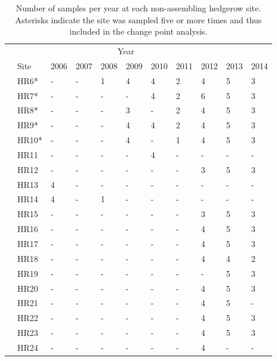 \documentclass[12pt]{article}
\begin{document}
\begin{table}
  \renewcommand*\arraystretch{1.25}
  \centering
  \caption{Number of samples per year at each non-assembling hedgerow
    site. Asterisks indicate the site was sampled five or more times
    and thus included in the change point analysis.} 
  \begin{tabular}{lllllllllll}
    \hline
    \multicolumn{10}{c}{\hspace{10em}Year}\\
    & Site & 2006 & 2007 & 2008 & 2009 & 2010 & 2011 & 2012 & 2013 & 2014\\
    \hline
    &HR6* & - & - & 1 & 4 & 4 & 2 & 4 & 5 & 3\\
    &HR7* & - & - & - & - & 4 & 2 & 6 & 5 & 3\\
    &HR8* & - & - & - & 3 & - & 2 & 4 & 5 & 3\\
    &HR9* & - & - & - & 4 & 4 & 2 & 4 & 5 & 3\\
    &HR10* & - & - & - & 4 & - & 1 & 4 & 5 & 3\\
    &HR11 & - & - & - & - & 4 & - & - & - & - \\
    &HR12 & - & - & - & - & - & - & 3 & 5 & 3\\
    &HR13 & 4 & - & - & - & - & - & - & - & -\\
    &HR14 & 4 & - & 1 & - & - & - & - & - & -\\
    &HR15 & - & - & - & - & - & - & 3 & 5 & 3\\
    &HR16 & - & - & - & - & - & - & 4 & 5 & 3\\
    &HR17 & - & - & - & - & - & - & 4 & 5 & 3\\
    &HR18 & - & - & - & - & - & - & 4 & 4 & 2 \\
    &HR19 & - & - & - & - & - & - & - & 5 & 3 \\
    &HR20 & - & - & - & - & - & - & 4 & 5 & 3\\
    &HR21 & - & - & - & - & - & - & 4 & 5 & -\\
    &HR22 & - & - & - & - & - & - & 4 & 5 & 3\\
    &HR23 & - & - & - & - & - & - & 4 & 5 & 3 \\
    &HR24 & - & - & - & - & - & - & 4 & - & -\\
    \hline
  \end{tabular}
  \label{tab:mature}
\end{table}
\clearpage
\end{document}
